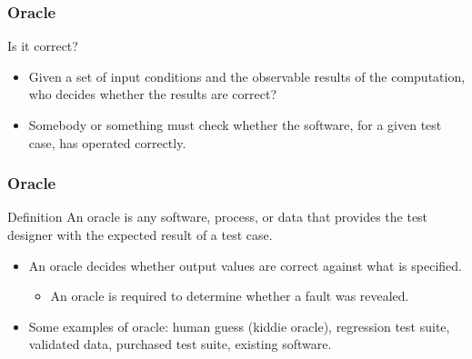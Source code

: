 \begin{frame}[parent={cmap:software-testing-foundations}, hasprev=false, hasnext=true]
\frametitle{Oracle}

\begin{block:fact}{Is it correct?}
\begin{itemize}
	\item Given a set of input conditions and the observable results of the
	computation, who decides whether the results are correct?

	\item Somebody or something must check whether the software, for a given
	test case, has operated correctly.
\end{itemize}
\end{block:fact}
\end{frame}


\begin{frame}[hasprev=true, hasnext=true]
\frametitle{Oracle}
\label{concept:oracle}

\begin{block:concept}{Definition}
An oracle is any software, process, or data that provides the test designer
with the expected result of a test case.
\end{block:concept}

\begin{block:fact}{}
\begin{itemize}
	\item An oracle decides whether output values are correct against what is
	specified.
	\begin{itemize}
		\item An oracle is required to determine whether a fault was revealed.
	\end{itemize}

	\item Some examples of oracle: human guess (kiddie oracle), regression
	test suite, validated data, purchased test suite, existing software.
\end{itemize}
\end{block:fact}
\end{frame}



